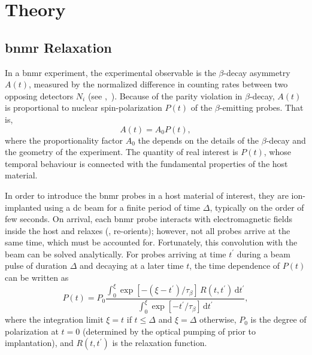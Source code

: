 \section{Theory \label{sec:theory}}

\subsection{\gls{bnmr} Relaxation}
In a \gls{bnmr} experiment, the experimental observable is the $\beta$-decay asymmetry $A(t)$, measured by the normalized difference in counting rates between two opposing detectors $N_{i}$ (see ,~\cite{1983-Ackermann-TCP-31-291, 2015-MacFarlane-SSNMR-68-1}).
Because of the parity violation in $\beta$-decay, $A(t)$ is proportional to nuclear spin-polarization $P(t)$ of the $\beta$-emitting probes.
That is,
\begin{equation}
   A(t) = A_{0} P(t),
\end{equation}
where the proportionality factor $A_{0}$ the depends on the details of the $\beta$-decay and the geometry of the experiment.
The quantity of real interest is $P(t)$, whose temporal behaviour is connected with the fundamental properties of the host material.

In order to introduce the \gls{bnmr} probes in a host material of interest, they are ion-implanted using a \gls{dc} beam for a finite period of time $\Delta$, typically on the order of few seconds.
On arrival, each \gls{bnmr} probe interacts with electromagnetic fields inside the host and relaxes (, re-orients);
however, not all probes arrive at the same time, which must be accounted for.
Fortunately, this convolution with the beam can be solved analytically.
For probes arriving at time $t^{\prime}$ during a beam pulse of duration $\Delta$ and decaying at a later time $t$, the time dependence of $P(t)$ can be written as~\cite{2006-Salman-PRL-96-147601, 2015-MacFarlane-PRB-92-064409}
%
\begin{equation} \label{eq:polarization}
P(t) = P_0 \frac{ \displaystyle \int_{0}^{\xi} \exp \left [ -\left (\xi - t^{\prime} \right ) / \tau_{\beta} \right ] \, R \left (t,t^{\prime} \right ) \, \mathrm{d}t^{\prime} }{ \displaystyle \int_{0}^{\xi} \exp \left [ -t^{\prime} / \tau_{\beta} \right ] \, \mathrm{d}t^{\prime} },
\end{equation}
%
where the integration limit $\xi = t$ if $t \leq \Delta$ and $\xi = \Delta$ otherwise,
$P_{0}$ is the degree of polarization at $t = 0$ (determined by the optical pumping of  prior to implantation),
and $R \left (t, t^{\prime} \right )$ is the relaxation function.


